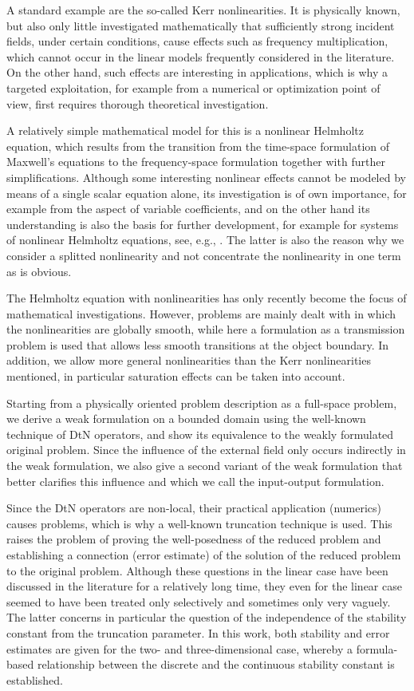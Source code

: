 \documentclass[12pt,DIV=14]{scrartcl}
\begin{document}
A standard example are the so-called Kerr nonlinearities.
It is physically known, but also only little investigated mathematically
that sufficiently strong incident fields, under certain conditions, cause effects
such as frequency multiplication, which cannot occur in the linear models
frequently considered in the literature.
On the other hand, such effects are interesting in applications,
which is why a targeted exploitation, for example from a numerical or
optimization point of view, first requires thorough theoretical investigation.

A relatively simple mathematical model for this is a nonlinear Helmholtz equation,
which results from the transition from the time-space formulation of Maxwell's equations
to the frequency-space formulation together with further simplifications.
Although some interesting nonlinear effects cannot be modeled by means of a single scalar equation
alone, its investigation is of own importance, for example from the aspect of variable coefficients,
and on the other hand its understanding is also the basis for further development,
for example for systems of nonlinear Helmholtz equations, see, e.g., \cite{Angermann:19a}.
The latter is also the reason why we consider a splitted nonlinearity
and not concentrate the nonlinearity in one term as is obvious.

The Helmholtz equation with nonlinearities has only recently become the focus
of mathematical investigations.
However, problems are mainly dealt with in which the nonlinearities are globally smooth,
while here a formulation as a transmission problem is used that allows
less smooth transitions at the object boundary.
In addition, we allow more general nonlinearities than the Kerr nonlinearities mentioned,
in particular saturation effects can be taken into account.

Starting from a physically oriented problem description as a full-space problem,
we derive a weak formulation on a bounded domain using the well-known technique
of DtN operators, and show its equivalence to the weakly formulated original problem.
Since the influence of the external field only occurs indirectly
in the weak formulation, we also give a second variant of the weak formulation
that better clarifies this influence and which we call the input-output formulation.

Since the DtN operators are non-local, their practical application (numerics) causes problems,
which is why a well-known truncation technique is used.
This raises the problem of proving the well-posedness of the reduced problem
and establishing a connection (error estimate) of the solution of the reduced problem
to the original problem.
Although these questions in the linear case have been discussed in the literature
for a relatively long time, they even for the linear case seemed to have been treated
only selectively and sometimes only very vaguely.
The latter concerns in particular the question of the independence of the stability constant
from the truncation parameter. In this work, both stability and error estimates are given
for the two- and three-dimensional case, whereby a formula-based relationship
between the discrete and the continuous stability constant is established.
\end{document}
